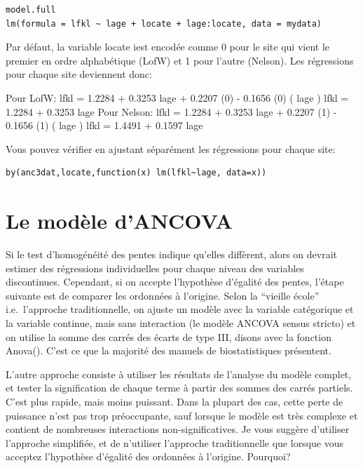\documentclass[12pt,]{book}
\begin{document}
\begin{verbatim}
model.full
lm(formula = lfkl ~ lage + locate + lage:locate, data = mydata)
\end{verbatim}

Par défaut, la variable locate iest encodée comme 0 pour le site qui
vient le premier en ordre alphabétique (LofW) et 1 pour l'autre
(Nelson). Les régressions pour chaque site deviennent donc:

Pour LofW:
lfkl = 1.2284 + 0.3253 lage + 0.2207 (0) - 0.1656 (0) ( lage )
lfkl = 1.2284 + 0.3253 lage
Pour Nelson:
lfkl = 1.2284 + 0.3253 lage + 0.2207 (1) - 0.1656 (1) ( lage )
lfkl = 1.4491 + 0.1597 lage

Vous pouvez vérifier en ajustant séparément les régressions pour
chaque site:

\begin{verbatim}
by(anc3dat,locate,function(x) lm(lfkl~lage, data=x))
\end{verbatim}

\hypertarget{le-moduxe8le-dancova}{%
\section{Le modèle d'ANCOVA}\label{le-moduxe8le-dancova}}

Si le test d'homogénéité des pentes indique qu'elles diffèrent, alors on
devrait estimer des régressions individuelles pour chaque niveau des
variables discontinues. Cependant, si on accepte l'hypothèse d'égalité
des pentes, l'étape suivante est de comparer les ordonnées à l'origine.
Selon la ``vieille école'' i.e.~l'approche traditionnelle, on ajuste un
modèle avec la variable catégorique et la variable continue, mais sans
interaction (le modèle ANCOVA sensus stricto) et on utilise la
somme des carrés des écarts de type III, disons avec la fonction
Anova(). C'est ce que la majorité des manuels de biostatistiques
présentent.

L'autre approche consiste à utiliser les résultats de l'analyse du modèle
complet, et tester la signification de chaque terme à partir des sommes
des carrés partiels. C'est plus rapide, mais moins puissant. Dans la
plupart des cas, cette perte de puissance n'est pas trop préoccupante,
sauf lorsque le modèle est très complexe et contient de nombreuses
interactions non-significatives. Je vous suggère d'utiliser l'approche
simplifiée, et de n'utiliser l'approche traditionnelle que lorsque vous
acceptez l'hypothèse d'égalité des ordonnées à l'origine. Pourquoi?
\end{document}
